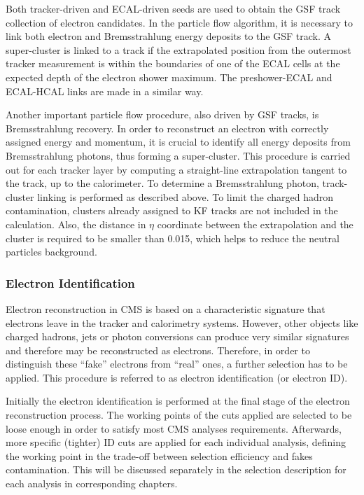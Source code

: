 Both tracker-driven and ECAL-driven seeds are used to obtain the GSF track collection of electron candidates. In the
particle flow algorithm, it is necessary to link both electron and Bremsstrahlung energy deposits to the GSF track. A
super-cluster is linked to a track if the extrapolated position from the outermost tracker measurement is within the
boundaries of one of the ECAL cells at the expected depth of the electron shower maximum. The preshower-ECAL and
ECAL-HCAL links are made in a similar way.

Another important particle flow procedure, also driven by GSF tracks, is Bremsstrahlung recovery. In order to
reconstruct an electron with correctly assigned energy and momentum, it is crucial to identify all energy deposits from
Bremsstrahlung photons, thus forming a super-cluster. This procedure is carried out for each tracker layer by computing
a straight-line extrapolation tangent to the track, up to the calorimeter. To determine a Bremsstrahlung photon,
track-cluster linking is performed as described above. To limit the charged hadron contamination, clusters already
assigned to KF tracks are not included in the calculation. Also, the distance in $\eta$ coordinate between the
extrapolation and the cluster is required to be smaller than \num{0.015}, which helps to reduce the neutral particles
background.

\subsubsection{Electron Identification}
\label{sss:electron_id}

Electron reconstruction in CMS is based on a characteristic signature that electrons leave in the tracker and
calorimetry systems. However, other objects like charged hadrons, jets or photon conversions can produce very similar
signatures and therefore may be reconstructed as electrons. Therefore, in order to distinguish these ``fake'' electrons
from ``real'' ones, a further selection has to be applied. This procedure is referred to as electron identification (or
electron ID).

Initially the electron identification is performed at the final stage of the electron reconstruction process. The
working points of the cuts applied are selected to be loose enough in order to satisfy most CMS analyses requirements.
Afterwards, more specific (tighter) ID cuts are applied for each individual analysis, defining the working point in the
trade-off between selection efficiency and fakes contamination. This will be discussed separately in the selection
description for each analysis in corresponding chapters.

